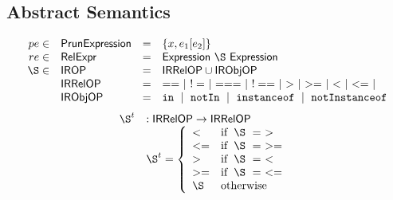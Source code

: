 \documentclass{article}
\newcommand{\ifc}[1]{{\rm if}\begin{array}[t]{l}#1\end{array}}
\newcommand{\SF}[1]{\mbox{\textsf{#1}}}
\newcommand{\TT}[1]{\mbox{\texttt{#1}}}
\newcommand{\owc}{{\rm otherwise}}
\newcommand{\rel}{\S}
\begin{document}
\subsection{Abstract Semantics}
\[
\begin{array}{rlcl}
pe \in & \SF{PrunExpression} & = & \{x, e_1[ e_2 ]\}\\
re \in & \SF{RelExpr} & = & \SF{Expression} ~\rel ~ \SF{Expression} \\
\rel \in & \SF{IROP} & = & \SF{IRRelOP} \cup \SF{IRObjOP} \\
& \SF{IRRelOP} & = &  == ~\mid~ != ~\mid~ === ~\mid~ !== ~\mid~ > ~\mid~ >= ~\mid~ < ~\mid~ <= ~\mid\\
& \SF{IRObjOP} & = & \TT{in} ~\mid~ \TT{notIn} ~\mid~ \TT{instanceof} ~\mid~ \TT{notInstanceof}\\
\end{array}
\]
\[
\begin{array}{ll}
\rel^t &: \SF{IRRelOP} \rightarrow \SF{IRRelOP}\\
& \rel^ t = \left\{
  \begin{array}{ll}
    < & \ifc{ \rel ~=~ >}\\
    <= & \ifc{ \rel ~=~ >=}\\
    > & \ifc{ \rel ~=~ <}\\
    >= & \ifc{ \rel ~=~ <=}\\
    \rel & \owc \\
  \end{array}
\right.\\
\\\\
  \end{array}
\]
\end{document}
